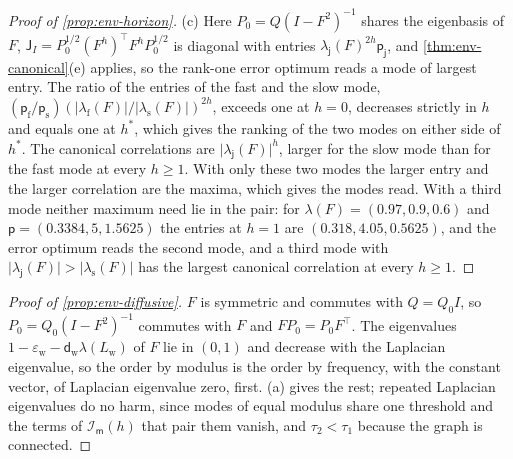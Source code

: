 \begin{proof}[Proof of \cref{prop:env-horizon}]
(c) Here $P_0=Q(I-F^2)^{-1}$ shares the eigenbasis of $F$, $\mathsf J_I=P_0^{1/2}(F^h)^\top F^hP_0^{1/2}$ is diagonal with entries $\lambda_{\mathsf j}(F)^{2h}\mathsf p_{\mathsf j}$, and \cref{thm:env-canonical}(e) applies, so the rank-one error optimum reads a mode of largest entry. The ratio of the entries of the fast and the slow mode, $(\mathsf p_{\mathrm f}/\mathsf p_{\mathrm s})(\lvert\lambda_{\mathrm f}(F)\rvert/\lvert\lambda_{\mathrm s}(F)\rvert)^{2h}$, exceeds one at $h=0$, decreases strictly in $h$ and equals one at $h^\ast$, which gives the ranking of the two modes on either side of $h^\ast$. The canonical correlations are $\lvert\lambda_{\mathsf j}(F)\rvert^h$, larger for the slow mode than for the fast mode at every $h\ge1$. With only these two modes the larger entry and the larger correlation are the maxima, which gives the modes read. With a third mode neither maximum need lie in the pair: for $\lambda(F)=(0.97,0.9,0.6)$ and $\mathsf p=(0.3384,5,1.5625)$ the entries at $h=1$ are $(0.318,4.05,0.5625)$, and the error optimum reads the second mode, and a third mode with $\lvert\lambda_{\mathsf j}(F)\rvert>\lvert\lambda_{\mathrm s}(F)\rvert$ has the largest canonical correlation at every $h\ge1$.
\end{proof}

\begin{proof}[Proof of \cref{prop:env-diffusive}]
$F$ is symmetric and commutes with $Q=Q_0I$, so $P_0=Q_0(I-F^2)^{-1}$ commutes with $F$ and $FP_0=P_0F^\top$. The eigenvalues $1-\varepsilon_{\mathrm w}-\mathsf d_{\mathrm w}\lambda(L_{\mathrm w})$ of $F$ lie in $(0,1)$ and decrease with the Laplacian eigenvalue, so the order by modulus is the order by frequency, with the constant vector, of Laplacian eigenvalue zero, first. (a) gives the rest; repeated Laplacian eigenvalues do no harm, since modes of equal modulus share one threshold and the terms of $\mathcal I_{\mathsf m}(h)$ that pair them vanish, and $\tau_2<\tau_1$ because the graph is connected.
\end{proof}

